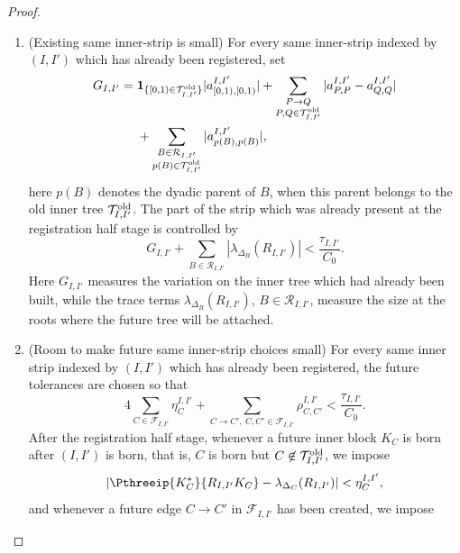 \documentclass[11pt,reqno]{amsart}
\makeatletter
\theoremstyle{plain}
\theoremstyle{definition}
\newcounter{problempaper}
\newenvironment{problempaperbody}{%
  \setcounter{subsection}{0}%
  \setcounter{subsubsection}{0}%
  \setcounter{paragraph}{0}%
  \renewcommand{\thesubsection}{\arabic{subsection}}%
  \renewcommand{\thesubsubsection}{\thesubsection.\arabic{subsubsection}}%
  \renewcommand{\theparagraph}{\thesubsubsection.\arabic{paragraph}}%
  \let\problem@outersection\section
  \let\problem@outersubsection\subsection
  \let\problem@outersubsubsection\subsubsection
  \let\problem@outerparagraph\paragraph
  \let\section\problem@papersection
  \let\subsection\problem@papersubsection
  \let\subsubsection\problem@papersubsubsection
}{%
  \let\section\problem@outersection
  \let\subsection\problem@outersubsection
  \let\subsubsection\problem@outersubsubsection
  \let\paragraph\problem@outerparagraph
}
\newcommand{\problem@target}[2]{%
  \hypertarget{problem-\theproblempaper-#1-#2}{}%
}
\newcommand{\problem@paperheading}[3]{%
  \par\bigskip
  \problem@target{#1}{#2}%
  \noindent{\large\bfseries #2.\quad #3\par}%
  \nobreak\smallskip
}
\newcommand{\problem@papersubheading}[3]{%
  \par\medskip
  \problem@target{#1}{#2}%
  \noindent{\normalsize\bfseries #2.\quad #3\par}%
  \nobreak\smallskip
}
\newcommand{\problem@papersubsubheading}[3]{%
  \par\smallskip
  \problem@target{#1}{#2}%
  \noindent{\normalsize\itshape #2.\quad #3.\ }%
}
\def\problem@papersection{%
  \@ifstar{\problem@papersectionstar}{\problem@papersectionnostar}%
}
\def\problem@papersectionstar#1{%
  \par\bigskip\noindent{\large\bfseries #1\par}\nobreak\smallskip
}
\def\problem@papersectionnostar#1{%
  \refstepcounter{subsection}%
  \setcounter{subsubsection}{0}%
  \setcounter{paragraph}{0}%
  \problem@paperheading{section}{\thesubsection}{#1}%
  \problem@writecontentsline{section}{\thesubsection}{#1}%
}
\def\problem@papersubsection{%
  \@ifstar{\problem@papersubsectionstar}{\problem@papersubsectionnostar}%
}
\def\problem@papersubsectionstar#1{%
  \par\medskip\noindent{\normalsize\bfseries #1\par}\nobreak\smallskip
}
\def\problem@papersubsectionnostar#1{%
  \refstepcounter{subsubsection}%
  \setcounter{paragraph}{0}%
  \problem@papersubheading{subsection}{\thesubsubsection}{#1}%
  \problem@writecontentsline{subsection}{\thesubsubsection}{#1}%
}
\def\problem@papersubsubsection{%
  \@ifstar{\problem@papersubsubsectionstar}{\problem@papersubsubsectionnostar}%
}
\def\problem@papersubsubsectionstar#1{%
  \par\smallskip\noindent{\normalsize\itshape #1.\ }%
}
\def\problem@papersubsubsectionnostar#1{%
  \refstepcounter{paragraph}%
  \problem@papersubsubheading{subsubsection}{\theparagraph}{#1}%
  \problem@writecontentsline{subsubsection}{\theparagraph}{#1}%
}
\newcommand{\problem@writecontentsline}[3]{%
  \begingroup
  \protected@write\@auxout{}{%
    \string\problemcontentsentry{\theproblempaper}{#1}{#2}{#3}{\thepage}%
  }%
  \endgroup
}
\newcommand{\problemcontentsentry}[5]{%
  \@ifundefined{problemcontents@#1}{%
    \expandafter\gdef\csname problemcontents@#1\endcsname{}%
  }{}%
  \expandafter\g@addto@macro\csname problemcontents@#1\endcsname{%
    \problemcontentsline{#1}{#2}{#3}{#4}{#5}%
  }%
}
\newcommand{\problemcontentslink}[4]{%
  \hyperlink{problem-#1-#2-#3}{#4}%
}
\newcommand{\problemcontentsline}[5]{%
  \ifstrequal{#2}{section}{%
    \par\noindent
    \problemcontentslink{#1}{#2}{#3}{\makebox[2.5em][l]{#3}#4}%
    \nobreak\dotfill
    \problemcontentslink{#1}{#2}{#3}{#5}\par
  }{%
    \ifstrequal{#2}{subsection}{%
      \par\noindent\hspace*{1.5em}%
      \problemcontentslink{#1}{#2}{#3}{\makebox[3.5em][l]{#3}#4}%
      \nobreak\dotfill
      \problemcontentslink{#1}{#2}{#3}{#5}\par
    }{%
      \par\noindent\hspace*{3em}%
      \problemcontentslink{#1}{#2}{#3}{\makebox[4.5em][l]{#3}#4}%
      \nobreak\dotfill
      \problemcontentslink{#1}{#2}{#3}{#5}\par
    }%
  }%
}
\makeatother
\begin{document}
\begin{problempaperbody}
\begin{proof}
\begin{enumerate}[label=\textup{(E\arabic*)},ref=E\arabic*]
\item\label{p3:item:estimate-inner-old-part} (Existing same inner-strip is small) For every same inner-strip indexed by $(I, I')$ which has already been registered, set
\begin{equation}
\label{p3:eq:old-inner-variation}
\begin{aligned}
    G_{I,I'}={}&
    \mathbf 1_{\{[0,1)\in\mathcal T_{I,I'}^{\rm old}\}}
        |a_{[0,1),[0,1)}^{I,I'}|
    +\sum_{\substack{P\to Q\\ P,Q\in\mathcal T_{I,I'}^{\rm old}}}
        |a_{P,P}^{I,I'}-a_{Q,Q}^{I,I'}| \\
    &+\sum_{\substack{B\in\mathcal R_{I,I'}\\ p(B)\in\mathcal T_{I,I'}^{\rm old}}}
        |a_{p(B),p(B)}^{I,I'}|,
    \end{aligned}
\end{equation}
here $p(B)$ denotes the dyadic parent of $B$, when this parent belongs to the old inner tree $\mathcal T_{I,I'}^{\rm old}$.
The part of the strip which was already present at the registration half stage is controlled by
\begin{equation}
\label{p3:eq:same-inner-birth-condition}
        G_{I,I'}+\sum_{B\in\mathcal R_{I,I'}}|\lambda_{\Delta_B}(R_{I,I'})|<\frac{\tau_{I,I'}}{C_0}.
\end{equation}
Here $G_{I,I'}$ measures the variation on the inner tree which had already been built, while the trace terms $\lambda_{\Delta_B}(R_{I,I'})$, $B\in\mathcal R_{I,I'}$, measure the size at the roots where the future tree will be attached.
\item\label{p3:item:estimate-inner-future-part} (Room to make future same inner-strip choices small) For every same inner strip indexed by $(I,I')$ which has already been registered, the future tolerances are chosen so that
\begin{equation}
\label{p3:eq:same-inner-future-budget}
        4\sum_{C\in\mathcal F_{I,I'}}\eta_C^{I,I'}+\sum_{C\to C',\ C,C'\in\mathcal F_{I,I'}}\rho_{C,C'}^{I,I'}<\frac{\tau_{I,I'}}{C_0}.
\end{equation}
After the registration half stage, whenever a future inner block $K_C$ is born after $(I, I')$ is born, that is, $C$ is born but $C \not \in \mathcal T_{I,I'}^{\rm old}$, we impose
\begin{equation}
\label{p3:eq:same-inner-node-estimate}
        |\Pthreeip{K_C^*}{R_{I,I'}K_C}-\lambda_{\Delta_C}(R_{I,I'})|<\eta_C^{I,I'},
\end{equation}
and whenever a future edge $C\to C'$ in $\mathcal F_{I,I'}$ has been created, we impose

\end{enumerate}
\end{proof}
\end{problempaperbody}
\end{document}
